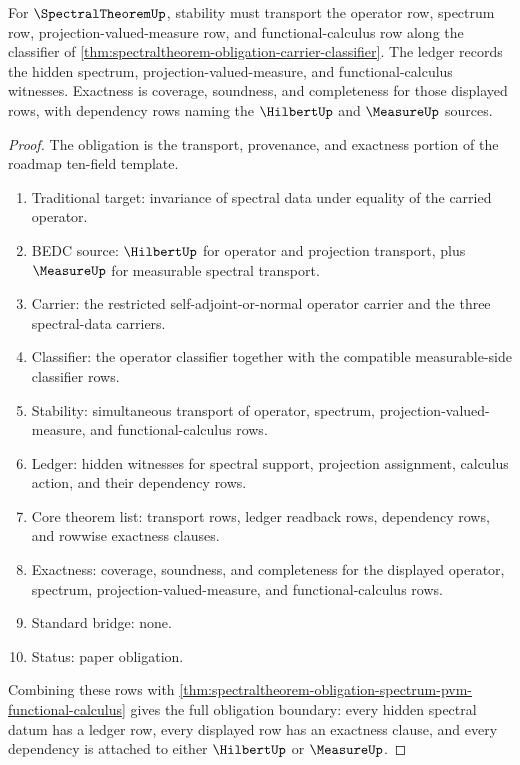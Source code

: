 \begin{theorem}
\label{thm:spectraltheorem-obligation-stability-ledger-exactness}
For $\SpectralTheoremUp$, stability must transport the operator row, spectrum row, projection-valued-measure row, and functional-calculus row along the classifier of \autoref{thm:spectraltheorem-obligation-carrier-classifier}. The ledger records the hidden spectrum, projection-valued-measure, and functional-calculus witnesses. Exactness is coverage, soundness, and completeness for those displayed rows, with dependency rows naming the $\HilbertUp$ and $\MeasureUp$ sources.
\end{theorem}
\begin{proof}
The obligation is the transport, provenance, and exactness portion of the roadmap ten-field template.
\begin{enumerate}
  \item Traditional target: invariance of spectral data under equality of the carried operator.
  \item BEDC source: $\HilbertUp$ for operator and projection transport, plus $\MeasureUp$ for measurable spectral transport.
  \item Carrier: the restricted self-adjoint-or-normal operator carrier and the three spectral-data carriers.
  \item Classifier: the operator classifier together with the compatible measurable-side classifier rows.
  \item Stability: simultaneous transport of operator, spectrum, projection-valued-measure, and functional-calculus rows.
  \item Ledger: hidden witnesses for spectral support, projection assignment, calculus action, and their dependency rows.
  \item Core theorem list: transport rows, ledger readback rows, dependency rows, and rowwise exactness clauses.
  \item Exactness: coverage, soundness, and completeness for the displayed operator, spectrum, projection-valued-measure, and functional-calculus rows.
  \item Standard bridge: none.
  \item Status: paper obligation.
\end{enumerate}

Combining these rows with \autoref{thm:spectraltheorem-obligation-spectrum-pvm-functional-calculus} gives the full obligation boundary: every hidden spectral datum has a ledger row, every displayed row has an exactness clause, and every dependency is attached to either $\HilbertUp$ or $\MeasureUp$.
\end{proof}

